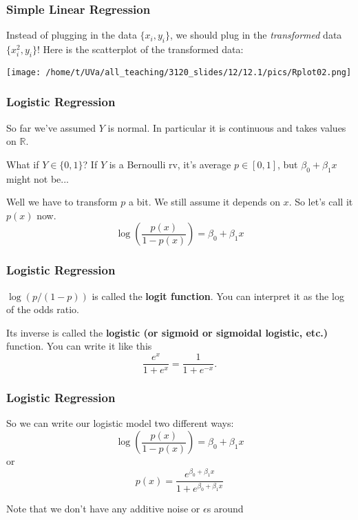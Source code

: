 \documentclass{beamer}
\begin{document}
\begin{frame}
\frametitle{Simple Linear Regression}

Instead of plugging in the data $\{x_i,y_i\}$, we should plug in the \emph{ transformed} data $\{x_i^2,y_i\}$! Here is the scatterplot of the transformed data:
\begin{center}
\texttt{[image: /home/t/UVa/all\_teaching/3120\_slides/12/12.1/pics/Rplot02.png]}
\end{center}


\end{frame}
\begin{frame}
\frametitle{Logistic Regression}

So far we've assumed $Y$ is normal. In particular it is continuous and takes values on $\mathbb{R}$. 
\newline

What if $Y \in \{0,1\}$? If $Y$ is a Bernoulli rv, it's average $p \in [0,1]$, but $\beta_0 + \beta_1 x$ might not be...
\pause
\newline

Well we have to transform $p$ a bit. We still assume it depends on $x$. So let's call it $p(x)$ now.
\[
\log \left( \frac{p(x)}{1 - p(x)} \right) = \beta_0 + \beta_1 x
\]
\end{frame}
\begin{frame}
\frametitle{Logistic Regression}

$\log(p/(1-p))$ is called the \textbf{logit function}. You can interpret it as the log of the odds ratio.
\newline

Its inverse is called the \textbf{logistic (or sigmoid or sigmoidal logistic, etc.)} function. You can write it like this 
$$
\frac{e^x}{1 + e^x} = \frac{1}{1 + e^{-x}}.
$$
\newline

\end{frame}
\begin{frame}
\frametitle{Logistic Regression}

So we can write our logistic model two different ways:
\[
\log \left( \frac{p(x)}{1 - p(x)} \right) = \beta_0 + \beta_1 x 
\]
or
\[
p(x) = \frac{e^{\beta_0 + \beta_1 x}}{1 + e^{\beta_0 + \beta_1x}}
\]


Note that we don't have any additive noise or $\epsilon$s around 
\end{frame}
\end{document}

